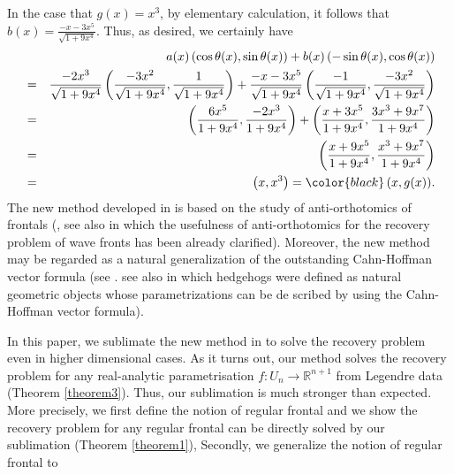 \documentclass{amsart}
\theoremstyle{definition}
\theoremstyle{definition}
\theoremstyle{definition}
\newcommand{\ch}[1]{{\color{black} #1}}
\begin{document}
In the case that $g(x)=x^3$, by elementary calculation, it follows that
$b(x)=\frac{-x-3x^5}{\sqrt{1+9x^4}}$. Thus, as desired, 
we certainly have 
\begin{eqnarray*}
{ } & { } & a(x)\left(\cos\theta(x), \sin\theta(x)\right) + 
b(x)\left(-\sin\theta(x), \cos\theta(x)\right) \\ 
{ } & = & 
\frac{-2x^3}{\sqrt{1+9x^4}}\left(\frac{-3x^2}{\sqrt{1+9x^4}}, 
\frac{1}{\sqrt{1+9x^4}}\right)
+
\frac{-x-3x^5}{\sqrt{1+9x^4}}\left(\frac{-1}{\sqrt{1+9x^4}}, 
\frac{-3x^2}{\sqrt{1+9x^4}}\right) \\ 
{ } & = & 
\left(\frac{6x^5}{{1+9x^4}}, 
\frac{-2x^3}{{1+9x^4}}\right)
+
\left(\frac{x+3x^5}{{1+9x^4}}, 
\frac{3x^3+9x^7}{{1+9x^4}}\right) \\ 
{ } & = & 
\left(\frac{x+9x^5}{1+9x^4}, \frac{x^3+9x^7}{1+9x^4}\right) \\ 
{ } & = & 
\left(x, x^3\right)=
{\color{black} 
\left(x, g(x)\right)
}.      
\end{eqnarray*}
The new method developed in \cite{nishimura, nishimura2} is based on the study 
of anti-orthotomics of frontals 
(\cite{janeczkonishimura}, see also \cite{alamocriado} in which 
the usefulness of anti-orthotomics for the recovery problem 
of wave fronts has been {\color{black}already} clarified).      
Moreover, the new method 
may be regarded as a natural generalization of the outstanding 
Cahn-Hoffman vector formula (see \cite{hoffmancahn}.  
{\color{black}see also 
\cite{hedgehog} in which hedgehogs were defined as natural geometric 
objects whose parametrizations can be de\ch{sc}ribed by using the Cahn-Hoffman 
vector formula}). 
\par 
\smallskip 
In this paper, we {\color{black}sublimate the new method 
in \cite{nishimura, nishimura2} to solve the recovery problem \ch{even} 
in higher dimensional cases.   \ch{As} 
it turns out, \ch{our method solves} 
the recovery problem for 
any {\color{black}real-analytic} 
parametrisation $f\colon U_n \to \mathbb{R}^{n+1}$ 
from Legendre data {\color{black}(Theorem \ref{theorem3})}.    
Thus, our sublimation 
is much \ch{stronger than expected}.}   
{\color{black}More precisely, we first define the notion of regular frontal 
and we show the recovery problem for any regular frontal can be 
directly solved by our sublimation {\color{black}(Theorem \ref{theorem1})},    
Secondly, we generalize the notion of regular frontal to} 
\end{document}
